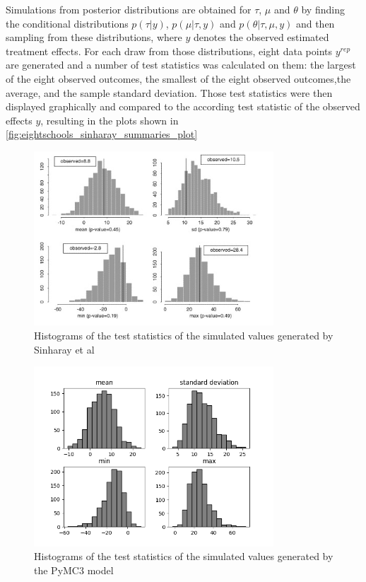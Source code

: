 \documentclass{article}
\begin{document}
Simulations from posterior distributions are obtained for $\tau$, $\mu$ and $\theta$ by finding the conditional distributions $p(\tau|\textit{y})$, $p(\mu|\tau, \textit{y})$ and $p(\theta|\tau, \mu, \textit{y})$ and then sampling from these distributions, where $\textit{y}$ denotes the observed estimated treatment effects. For each draw from those distributions, eight data points $y^{rep}$ are generated and a number of test statistics was calculated on them: the largest of the eight observed outcomes,  the smallest of the eight observed outcomes,the  average, and the sample  standard deviation. Those test statistics were then displayed graphically and compared to the according test statistic of the observed effects $\textit{y}$, resulting in the plots shown in \autoref{fig:eightschools_sinharay_summaries_plot}
\begin{figure}
	\centering
	\includegraphics[width=0.8\textwidth]{images/eight_schools_sinharay_summaries_plot.png}
	\caption[Histograms of the test statistics of the simulated values generated by Sinharay et al. Source: \cite{sinharay2003posterior}]{Histograms of the test statistics of the simulated values generated by Sinharay et al}
	\label{fig:eightschools_sinharay_summaries_plot}
\end{figure}
\begin{figure}
	\centering
	\includegraphics[width=0.8\textwidth]{images/eight_schools_pymc3_summaries_plot.png}
	\caption[Histograms of the test statistics of the simulated values generated by the PyMC3 model]{Histograms of the test statistics of the simulated values generated by the PyMC3 model}
	\label{fig:eightschools_PyMC3_summaries_plot}
\end{figure}
\end{document}
